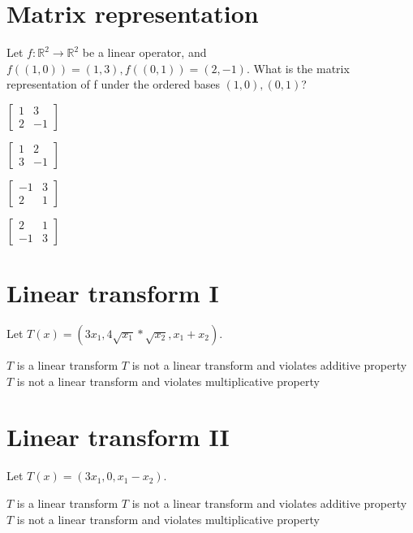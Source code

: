 \documentclass{exam}
\begin{document}
\section{Matrix representation}
Let $f : \mathbb{R}^2 \to \mathbb{R}^2$ be a linear operator, and $f((1, 0)) = (1, 3), f((0, 1)) = (2, −1)$. What is the matrix representation of f under the ordered bases ${(1, 0), (0, 1)}$?

\begin{oneparchoices}
  \choice $\begin{bmatrix}
            1 & 3 \\
            2 & -1
          \end{bmatrix}$

  \choice $\begin{bmatrix}
            1 & 2 \\
            3 & -1
          \end{bmatrix}$

  \choice $\begin{bmatrix}
            -1 & 3 \\
            2 & 1
          \end{bmatrix}$

  \choice $\begin{bmatrix}
            2 & 1 \\
            -1 & 3
          \end{bmatrix}$
\end{oneparchoices}

\section{Linear transform I}
Let $T(x) = (3x_1, 4\sqrt{x_1}*\sqrt{x_2}, x_1 + x_2)$.

\begin{oneparchoices}
\choice $T$ is a linear transform
\choice $T$ is not a linear transform and violates additive property
\choice $T$ is not a linear transform and violates multiplicative property
\end{oneparchoices}

\section{Linear transform II}
Let $T(x) = (3x_1, 0, x_1 - x_2)$.

\begin{oneparchoices}
\choice $T$ is a linear transform
\choice $T$ is not a linear transform and violates additive property
\choice $T$ is not a linear transform and violates multiplicative property
\end{oneparchoices}
\end{document}
